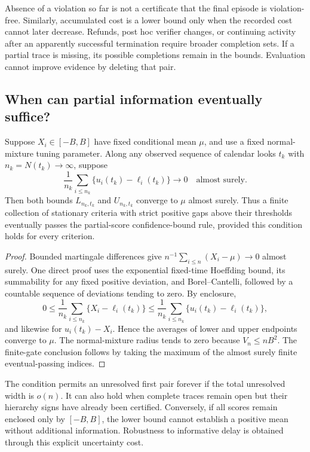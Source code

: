 Absence of a violation so far is not a certificate that the final
episode is violation-free. Similarly, accumulated cost is a lower bound
only when the recorded cost cannot later decrease. Refunds, post hoc
verifier changes, or continuing activity after an apparently successful
termination require broader completion sets. If a partial trace is
missing, its possible completions remain in the bounds. Evaluation
cannot improve evidence by deleting that pair.

\subsection{When can partial information eventually suffice?}

\begin{proposition}
\label{prop:async_consistency}
Suppose $X_i\in[-B,B]$ have fixed conditional mean $\mu$, and use a
fixed normal-mixture tuning parameter. Along any observed sequence of
calendar looks $t_k$ with $n_k=N(t_k)\to\infty$, suppose
\[
 \frac1{n_k}\sum_{i\leq n_k}
       \{u_i(t_k)-\ell_i(t_k)\}\longrightarrow0
 \quad\text{almost surely}.
\]
Then both bounds $L_{n_k,t_k}$ and $U_{n_k,t_k}$ converge to $\mu$
almost surely. Thus a finite collection of stationary criteria with
strict positive gaps above their thresholds eventually passes the
partial-score confidence-bound rule, provided this condition holds
for every criterion.
\end{proposition}
\begin{proof}
Bounded martingale differences give
$n^{-1}\sum_{i\leq n}(X_i-\mu)\to0$ almost surely. One direct proof
uses the exponential fixed-time Hoeffding bound, its summability for
any fixed positive deviation, and Borel--Cantelli, followed by a
countable sequence of deviations tending to zero. By enclosure,
\[
 0\leq\frac1{n_k}\sum_{i\leq n_k}\{X_i-\ell_i(t_k)\}
 \leq\frac1{n_k}\sum_{i\leq n_k}\{u_i(t_k)-\ell_i(t_k)\},
\]
and likewise for $u_i(t_k)-X_i$. Hence the averages of lower and upper
endpoints converge to $\mu$. The normal-mixture radius tends to zero
because $V_n\leq nB^2$. The finite-gate conclusion follows by taking
the maximum of the almost surely finite eventual-passing indices.
\end{proof}

The condition permits an unresolved first pair forever if the total
unresolved width is $o(n)$. It can also hold when complete traces remain
open but their hierarchy signs have already been certified. Conversely,
if all scores remain enclosed only by $[-B,B]$, the lower bound cannot
establish a positive mean without additional information. Robustness to
informative delay is obtained through this explicit uncertainty cost.

